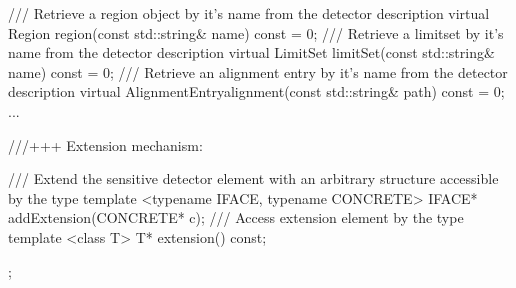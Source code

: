 \documentclass[10pt,a4paper]{article}
\begin{document}
\begin{code}
{  /// Retrieve a region object by it's name from the detector description
  virtual Region        region(const std::string& name)    const = 0;
  /// Retrieve a limitset by it's name from the detector description
  virtual LimitSet      limitSet(const std::string& name)      const = 0;
  /// Retrieve an alignment entry by it's name from the detector description
  virtual AlignmentEntryalignment(const std::string& path)     const = 0;
  ...
  
  ///+++ Extension mechanism:

  /// Extend the sensitive detector element with an arbitrary structure accessible by the type
  template <typename IFACE, typename CONCRETE> IFACE* addExtension(CONCRETE* c);
  /// Access extension element by the type
  template <class T> T* extension() const;
};
\end{code}
\end{document}
